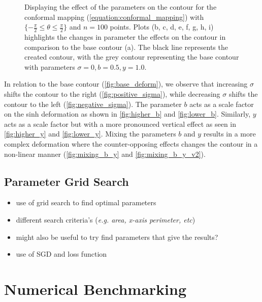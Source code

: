 \documentclass[a4paper]{report}
\begin{document}
\begin{figure}[ht]
    \caption{Displaying the effect of the parameters on the contour for the conformal mapping (\ref{equation:conformal_mapping}) with $\{-\frac{\pi}{2} \leq \theta \leq \frac{\pi}{2} \}$ and $n = 100$ points. Plots (b, c, d, e, f, g, h, i) highlights the changes in parameter the effects on the contour in comparison to the base contour (a). The black line represents the created contour, with the grey contour representing the base contour with parameters $\sigma = 0, b = 0.5, y = 1.0$.}
\end{figure}

In relation to the base contour (\autoref{fig:base_deform}), we observe that increasing $\sigma$ shifts the contour to the right (\autoref{fig:positive_sigma}), while decreasing $\sigma$ shifts the contour to the left (\autoref{fig:negative_sigma}). The parameter $b$ acts as a scale factor on the sinh deformation as shown in \autoref{fig:higher_b} and \ref{fig:lower_b}. Similarly, $y$ acts as a scale factor but with a more pronounced vertical effect as seen in \autoref{fig:higher_y} and \ref{fig:lower_y}. Mixing the parameters $b$ and $y$ results in a more complex deformation where the counter-opposing effects changes the contour in a non-linear manner (\autoref{fig:mixing_b_y} and \ref{fig:mixing_b_y_v2}).


\subsection{Parameter Grid Search}
\begin{itemize}
    \item use of grid search to find optimal parameters
    \item different search criteria's (\textit{e.g. area, x-axis perimeter, etc})
    \item might also be useful to try find parameters that give the results?
    \item use of SGD and loss function
\end{itemize}

\section{Numerical Benchmarking}
\end{document}
